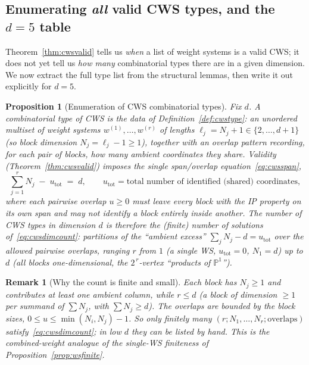 \documentclass{amsart}
\newtheorem{proposition}[theorem]{Proposition}
\newtheorem{remark}[theorem]{Remark}
\begin{document}
\subsection{Enumerating \emph{all} valid CWS types, and the $d=5$ table}
\label{sec:algo-cwstypes}

Theorem~\ref{thm:cwsvalid} tells us \emph{when} a list of weight systems is a
valid CWS; it does not yet tell us \emph{how many} combinatorial types there
are in a given dimension. We now extract the full type list from the
structural lemmas, then write it out explicitly for $d=5$.

\begin{proposition}[Enumeration of CWS combinatorial types]\label{prop:cwsenum}
Fix $d$. A combinatorial type of CWS is the data of
Definition~\ref{def:cwstype}: an unordered multiset of weight systems
$w^{(1)},\dots,w^{(r)}$ of \emph{lengths} $\ell_j=N_j{+}1\in\{2,\dots,d{+}1\}$
(so block dimension $N_j=\ell_j-1\ge 1$), together with an overlap pattern
recording, for each pair of blocks, how many ambient coordinates they share.
Validity (Theorem~\ref{thm:cwsvalid}) imposes the single
\emph{span/overlap} equation~\eqref{eq:cwsspan},
\begin{equation}\label{eq:cwsdimcount}
  \sum_{j=1}^{r} N_j \;-\; u_{\mathrm{tot}} \;=\; d ,
  \qquad
  u_{\mathrm{tot}} = \text{total number of identified (shared) coordinates},
\end{equation}
where each pairwise overlap $u\ge 0$ must leave every block with the IP
property on its own span and may not identify a block entirely inside another.
The number of CWS types in dimension $d$ is therefore the (finite) number of
solutions of~\eqref{eq:cwsdimcount}: partitions of the ``ambient excess''
$\sum_j N_j - d = u_{\mathrm{tot}}$ over the allowed pairwise overlaps,
ranging $r$ from $1$ (a single WS, $u_{\mathrm{tot}}=0$, $N_1=d$) up to $d$
(all blocks one-dimensional, the $2^{\,r}$-vertex ``products of
$\mathbb{P}^1$'').
\end{proposition}

\begin{remark}[Why the count is finite and small]
Each block has $N_j\ge 1$ and contributes at least one ambient column, while
$r\le d$ (a block of dimension $\ge 1$ per summand of $\sum N_j$, with
$\sum N_j\ge d$). The overlaps are bounded by the block sizes, $0\le u\le
\min(N_i,N_j)-1$. So only finitely many $(r;N_1,\dots,N_r;\text{overlaps})$
satisfy~\eqref{eq:cwsdimcount}; in low $d$ they can be listed by hand. This is
the combined-weight analogue of the single-WS finiteness of
Proposition~\ref{prop:wsfinite}.
\end{remark}
\end{document}
